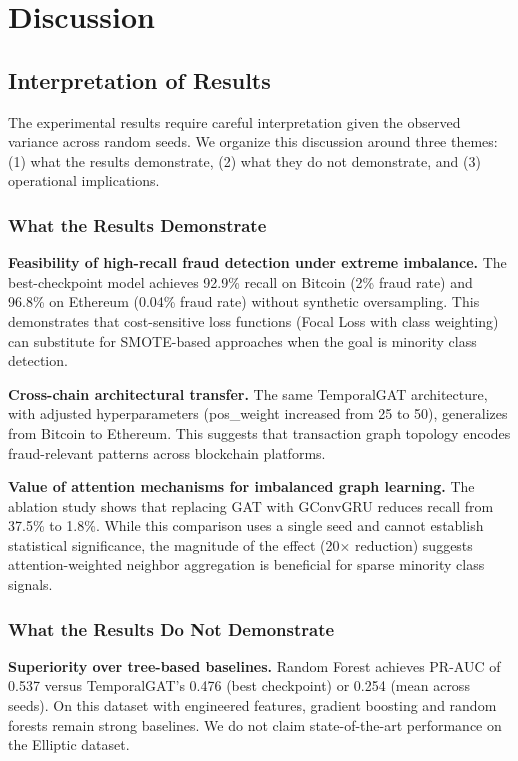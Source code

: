 \documentclass[12pt,a4paper]{article}
\begin{document}
\section{Discussion}

\subsection{Interpretation of Results}
The experimental results require careful interpretation given the observed variance across random seeds. We organize this discussion around three themes: (1) what the results demonstrate, (2) what they do not demonstrate, and (3) operational implications.

\subsubsection{What the Results Demonstrate}
\textbf{Feasibility of high-recall fraud detection under extreme imbalance.} The best-checkpoint model achieves 92.9\% recall on Bitcoin (2\% fraud rate) and 96.8\% on Ethereum (0.04\% fraud rate) without synthetic oversampling. This demonstrates that cost-sensitive loss functions (Focal Loss with class weighting) can substitute for SMOTE-based approaches when the goal is minority class detection.

\textbf{Cross-chain architectural transfer.} The same TemporalGAT architecture, with adjusted hyperparameters (pos\_weight increased from 25 to 50), generalizes from Bitcoin to Ethereum. This suggests that transaction graph topology encodes fraud-relevant patterns across blockchain platforms.

\textbf{Value of attention mechanisms for imbalanced graph learning.} The ablation study shows that replacing GAT with GConvGRU reduces recall from 37.5\% to 1.8\%. While this comparison uses a single seed and cannot establish statistical significance, the magnitude of the effect (20$\times$ reduction) suggests attention-weighted neighbor aggregation is beneficial for sparse minority class signals.

\subsubsection{What the Results Do Not Demonstrate}
\textbf{Superiority over tree-based baselines.} Random Forest achieves PR-AUC of 0.537 versus TemporalGAT's 0.476 (best checkpoint) or 0.254 (mean across seeds). On this dataset with engineered features, gradient boosting and random forests remain strong baselines. We do not claim state-of-the-art performance on the Elliptic dataset.
\end{document}
